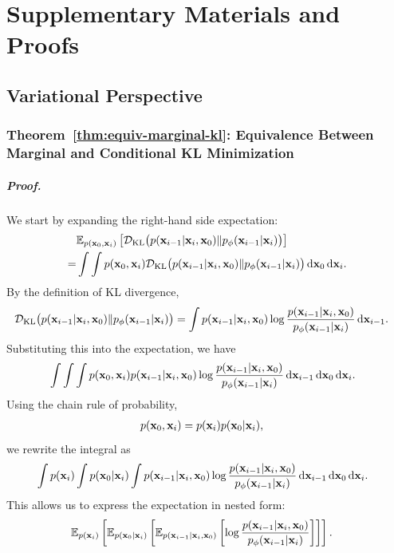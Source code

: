 \chapter{Supplementary Materials and Proofs}\label{app:proof}
\section{Variational Perspective}\label{app-sec:var-proof}


\subsection{Theorem~\ref{thm:equiv-marginal-kl}: Equivalence Between Marginal and Conditional KL Minimization}\label{subsec:proof-equiv-marginal-kl}
\paragraph{\textit{Proof.}} 

We start by expanding the right-hand side expectation:
\begin{align*}
    &\mathbb{E}_{p({\mathbf{x}}_0, {\mathbf{x}}_i)}\left[
    \mathcal{D}_{\text{KL}} \big(p({\mathbf{x}}_{i-1}|{\mathbf{x}}_i, {\mathbf{x}}_0) \| p_\phi({\mathbf{x}}_{i-1}|{\mathbf{x}}_i)\big)
    \right]
    \\
    =& \int \int p({\mathbf{x}}_0, {\mathbf{x}}_i)   
    \mathcal{D}_{\text{KL}} \big(p({\mathbf{x}}_{i-1}|{\mathbf{x}}_i, {\mathbf{x}}_0) \| p_\phi({\mathbf{x}}_{i-1}|{\mathbf{x}}_i)\big) 
    \mathop{}\!\mathrm{d}{\mathbf{x}}_0 \mathop{}\!\mathrm{d}{\mathbf{x}}_i.
\end{align*}
By the definition of KL divergence,
\begin{align*}
    &\mathcal{D}_{\text{KL}} \big(p({\mathbf{x}}_{i-1}|{\mathbf{x}}_i, {\mathbf{x}}_0) \| p_\phi({\mathbf{x}}_{i-1}|{\mathbf{x}}_i)\big)
    = \int p({\mathbf{x}}_{i-1}|{\mathbf{x}}_i, {\mathbf{x}}_0) 
    \log \frac{p({\mathbf{x}}_{i-1}|{\mathbf{x}}_i, {\mathbf{x}}_0)}{p_\phi({\mathbf{x}}_{i-1}|{\mathbf{x}}_i)} 
    \mathop{}\!\mathrm{d}{\mathbf{x}}_{i-1}.
\end{align*}
Substituting this into the expectation, we have
\begin{align*}
    &\int \int \int p({\mathbf{x}}_0, {\mathbf{x}}_i)  p({\mathbf{x}}_{i-1}|{\mathbf{x}}_i, {\mathbf{x}}_0) 
    \log \frac{p({\mathbf{x}}_{i-1}|{\mathbf{x}}_i, {\mathbf{x}}_0)}{p_\phi({\mathbf{x}}_{i-1}|{\mathbf{x}}_i)} 
    \mathop{}\!\mathrm{d}{\mathbf{x}}_{i-1} \mathop{}\!\mathrm{d}{\mathbf{x}}_0 \mathop{}\!\mathrm{d}{\mathbf{x}}_i.
\end{align*}
Using the chain rule of probability,
\begin{align*}
    p({\mathbf{x}}_0, {\mathbf{x}}_i) 
    &= p({\mathbf{x}}_i)   p({\mathbf{x}}_0|{\mathbf{x}}_i),
\end{align*}
we rewrite the integral as
\begin{align*}
    &\int p({\mathbf{x}}_i) \int p({\mathbf{x}}_0|{\mathbf{x}}_i) \int p({\mathbf{x}}_{i-1}|{\mathbf{x}}_i, {\mathbf{x}}_0)
    \log \frac{p({\mathbf{x}}_{i-1}|{\mathbf{x}}_i, {\mathbf{x}}_0)}{p_\phi({\mathbf{x}}_{i-1}|{\mathbf{x}}_i)} 
    \mathop{}\!\mathrm{d}{\mathbf{x}}_{i-1} \mathop{}\!\mathrm{d}{\mathbf{x}}_0 \mathop{}\!\mathrm{d}{\mathbf{x}}_i.
\end{align*}
This allows us to express the expectation in nested form:
\begin{align*}
    &\mathbb{E}_{p({\mathbf{x}}_i)} \left[
    \mathbb{E}_{p({\mathbf{x}}_0|{\mathbf{x}}_i)} \left[
    \mathbb{E}_{p({\mathbf{x}}_{i-1}|{\mathbf{x}}_i, {\mathbf{x}}_0)} \left[
    \log \frac{p({\mathbf{x}}_{i-1}|{\mathbf{x}}_i, {\mathbf{x}}_0)}{p_\phi({\mathbf{x}}_{i-1}|{\mathbf{x}}_i)}
    \right]
    \right]
    \right].
\end{align*}

